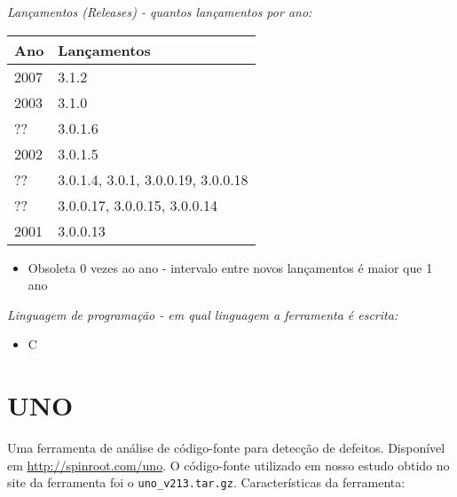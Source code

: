 \begin{description}

  \item {\it Lançamentos ({\it Releases}) - quantos lançamentos por ano:}
    \begin{table}[h!]
      \centering
      \begin{tabular}{| l | l |}
        \hline
        Ano  & Lançamentos                        \\
        \hline
        2007 & 3.1.2                              \\
        2003 & 3.1.0                              \\
        ??   & 3.0.1.6                            \\
        2002 & 3.0.1.5                            \\
        ??   & 3.0.1.4, 3.0.1, 3.0.0.19, 3.0.0.18 \\
        ??   & 3.0.0.17, 3.0.0.15, 3.0.0.14       \\
        2001 & 3.0.0.13                           \\
        \hline
      \end{tabular}
    \end{table}
    \begin{itemize}
      \item Obsoleta $0$ vezes ao ano - intervalo entre novos lançamentos é maior que 1 ano
    \end{itemize}

  \item {\it Linguagem de programação - em qual linguagem a ferramenta é escrita:}
    \begin{itemize}
      \item C
    \end{itemize}

\end{description}

\section{UNO}

Uma ferramenta de análise de código-fonte para detecção de defeitos.
Disponível em \url{http://spinroot.com/uno}. O código-fonte utilizado em nosso
estudo obtido no site da ferramenta foi o \texttt{uno\_v213.tar.gz}.
Características da ferramenta:

